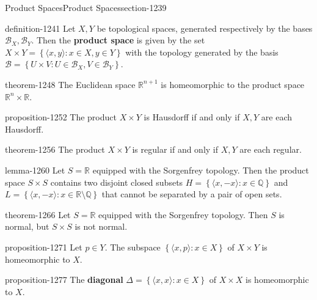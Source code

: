 \documentclass[oneside,10pt,]{article}
\newcommand{\terminology}[1]{\textbf{#1}}
\newcommand{\tuple}[1]{\langle #1 \rangle}
\newcommand{\mb}{\mathbb}
\newcommand{\mc}{\mathcal}
\newcommand{\setBuilder}[2]{\left\{#1:#2\right\}}
\begin{document}
%
%
\typeout{************************************************}
\typeout{************************************************}
%
\begin{sectionptx}{Product Spaces}{}{Product Spaces}{}{}{section-1239}
\begin{definition}{}{definition-1241}%
\hypertarget{p-1242}{}%
Let \(X,Y\) be topological spaces, generated respectively by the bases \(\mc B_X,\mc B_Y\). Then the \terminology{product space} is given by the set \(X\times Y=\setBuilder{\tuple{x,y}}{x\in X,y\in Y}\) with the topology generated by the basis \(\mc B=\setBuilder{U\times V}{U\in\mc B_X,V\in\mc B_Y}\).%
\end{definition}
\begin{theorem}{}{}{theorem-1248}%
\hypertarget{p-1249}{}%
The Euclidean space \(\mb R^{n+1}\) is homeomorphic to the product space \(\mb R^n\times\mb R\).%
\end{theorem}
\begin{proposition}{}{}{proposition-1252}%
\hypertarget{p-1253}{}%
The product \(X\times Y\) is Hausdorff if and only if \(X,Y\) are each Hausdorff.%
\end{proposition}
\begin{theorem}{}{}{theorem-1256}%
\hypertarget{p-1257}{}%
The product \(X\times Y\) is regular if and only if \(X,Y\) are each regular.%
\end{theorem}
\begin{lemma}{}{}{lemma-1260}%
\hypertarget{p-1261}{}%
Let \(S=\mb R\) equipped with the Sorgenfrey topology. Then the product space \(S\times S\) contains two disjoint closed subsets \(H=\setBuilder{\tuple{x,-x}}{x\in\mb Q}\) and \(L=\setBuilder{\tuple{x,-x}}{x\in\mb R\setminus\mb Q}\) that cannot be separated by a pair of open sets.%
\end{lemma}
\begin{theorem}{}{}{theorem-1266}%
\hypertarget{p-1267}{}%
Let \(S=\mb R\) equipped with the Sorgenfrey topology. Then \(S\) is normal, but \(S\times S\) is not normal.%
\end{theorem}
\begin{proposition}{}{}{proposition-1271}%
\hypertarget{p-1272}{}%
Let \(p\in Y\). The subspace \(\setBuilder{\tuple{x,p}}{x\in X}\) of \(X\times Y\) is homeomorphic to \(X\).%
\end{proposition}
\begin{proposition}{}{}{proposition-1277}%
\hypertarget{p-1278}{}%
The \terminology{diagonal} \(\Delta=\setBuilder{\tuple{x,x}}{x\in X}\) of \(X\times X\) is homeomorphic to \(X\).%

\end{proposition}
\end{sectionptx}
\end{document}
